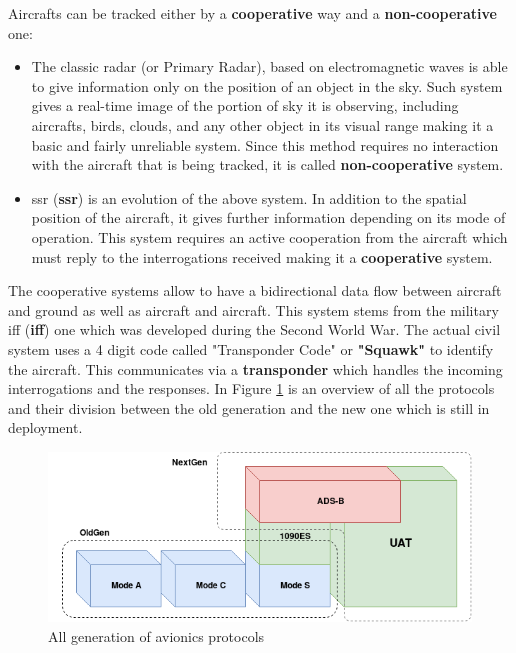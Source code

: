 \documentclass[../main.tex]{subfiles}
\begin{document}
Aircrafts can be tracked either by a \textbf{cooperative} way  and a \textbf{non-cooperative} one:

\begin{itemize}

  \item The classic radar (or Primary Radar), based on electromagnetic waves is able to give information only on the position of an object in the sky. Such system gives a real-time image of the portion of sky it is observing, including aircrafts, birds, clouds, and any other object in its visual range making it a basic and fairly unreliable system. Since this method requires no interaction with the aircraft that is being tracked, it is called \textbf{non-cooperative} system.

  \item \acrlong{ssr} (\textbf{\acrshort{ssr}}) is an evolution of the above system. In addition to the spatial position of the aircraft, it gives further information depending on its mode of operation. This system requires an active cooperation from the aircraft which must reply to the interrogations received making it a \textbf{cooperative} system.

\end{itemize}

The cooperative systems allow to have a bidirectional data flow between aircraft
and ground as well as aircraft and aircraft. This system stems from the military
\acrlong{iff} (\textbf{\acrshort{iff}}) one which was developed during the
Second World War. The actual civil system uses a 4 digit code called
"Transponder Code" or \textbf{"Squawk"} to identify the aircraft. This
communicates via a \textbf{transponder} which handles the incoming
interrogations and the responses. In Figure \ref{fig:allgen} is an overview of
all the protocols and their division between the old generation and the new one
which is still in deployment.

\begin{figure}[htp]
  \centering
  \includegraphics[scale=0.6]{images/allgen.png}
  \caption{All generation of avionics protocols}
  \label{fig:allgen}
\end{figure}
\end{document}
